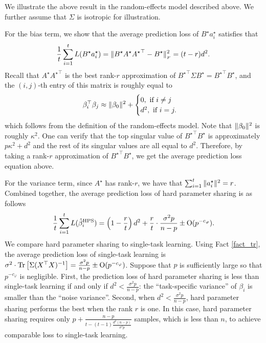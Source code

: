 \begin{example}\label{ex_same_cov}
We illustrate the above result in the random-effects model described above.
We further assume that $\Sigma$ is isotropic for illustration.

For the bias term, we show that the average prediction loss of $B^{\star} a_i^{\star}$ satisfies that
\[ \frac{1}{t} \sum_{i=1}^t L(B^{\star} a_i^{\star}) = \|B^{\star} A^{\star} {A^{\star}}^{\top} - B^{\star}\|_{_{F}}^2 = (t - r) d^2. \]
Recall that $A^{\star} {A^{\star}}^{\top}$ is the best rank-$r$ approximation of ${B^{\star}}^{\top}\Sigma B^{\star} = {B^{\star}}^{\top} B^{\star}$, and the $(i, j)$-th entry of this matrix is roughly equal to
\begin{align*}
	\beta_i^{\top} \beta_j \approx \|\beta_0\|^2 + \begin{cases}
																								0, \text{ if } i \neq j \\
																								d^2, \text{ if } i = j.
	\end{cases}
\end{align*}
which follows from the definition of the random-effects model.
Note that $\|\beta_0\|^2$ is roughly $\kappa^2$.
One can verify that the top singular value of ${B^{\star}}^{\top} B^{\star}$ is approximately $p \kappa^2 + d^2$ and the rest of its singular values are all equal to $d^2$.
Therefore, by taking a rank-$r$ approximation of ${B^{\star}}^{\top} B^{\star}$, we get the average prediction loss equation above.

For the variance term, since $A^{\star}$ has rank-$r$, we have that $\sum_{i=1}^t \|a_i^{\star}\|^2 = r$.
Combined together, the average prediction loss of hard parameter sharing is as follows
\[ \frac{1}{t}\sum_{i=1}^t L(\hat{\beta}_i^{\textup{HPS}}) = \left({1 - \frac{r}{t}}\right) d^2 + \frac{r}{t} \cdot \frac{\sigma^2 p}{n - p} \pm \operatorname{O}(p^{-c_{\varphi}}). \]
We compare hard parameter sharing to single-task learning.
Using Fact \ref{fact_tr}, the average prediction loss of single-task learning is $\sigma^2\cdot \operatorname{Tr}\left[\Sigma (X^{\top} X)^{-1}\right] = \frac{\sigma^2 p}{n - p} \pm \operatorname{O}(p^{-{c_{\varphi}}})$.
	Suppose that $p$ is sufficiently large so that $p^{-c_{\varphi}}$ is negligible.
First, the prediction loss of hard parameter sharing is less than single-task learning if and only if $d^2 < \frac{\sigma^2 p}{n - p}$: the ``task-specific variance'' of $\beta_i$ is smaller than the ``noise variance''.
Second, when $d^2 < \frac{\sigma^2 p}{n - p}$, hard parameter sharing performs the best when the rank $r$ is one.
	In this case, hard parameter sharing requires only $p + \frac{n - p}{t - (t - 1)\frac{d^2 (n - p)}{\sigma^2 p}}$ samples, which is less than $n$, to achieve comparable loss to single-task learning.
\end{example}


